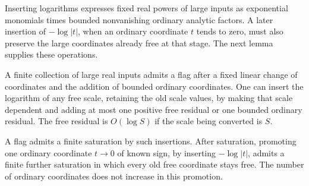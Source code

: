 Inserting logarithms expresses fixed real powers of large inputs as
exponential monomials times bounded nonvanishing ordinary analytic factors. A later insertion of $-\log|t|$, when an ordinary
coordinate $t$ tends to zero, must also preserve the large coordinates
already free at that stage. The next lemma supplies these operations.

\begin{lemma}
\label{lem:flags-saturation}
A finite collection of large real inputs admits a flag after a fixed
linear change of coordinates and the addition of bounded ordinary
coordinates. One can insert the logarithm of any free scale, retaining
the old scale values, by making that scale dependent and adding at most
one positive free residual or one bounded ordinary residual. The free
residual is $O(\log S)$ if the scale being converted is $S$.

A flag admits a finite saturation by such insertions. After saturation,
promoting one ordinary coordinate $t\to0$ of known sign, by inserting
$-\log|t|$, admits a finite further saturation in which every old free
coordinate stays free. The number of ordinary coordinates does not
increase in this promotion.

\end{lemma}

